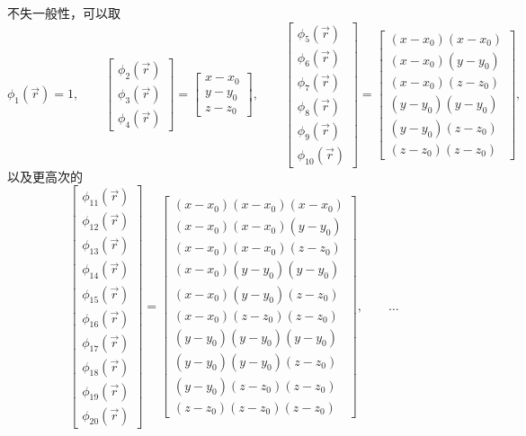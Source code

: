 不失一般性，可以取
\begin{equation}
\phi_{1}(\vec{r})=1,\qquad\begin{bmatrix}\phi_{2}(\vec{r})\\
\phi_{3}(\vec{r})\\
\phi_{4}(\vec{r})
\end{bmatrix}=\begin{bmatrix}x-x_{0}\\
y-y_{0}\\
z-z_{0}
\end{bmatrix},\qquad\begin{bmatrix}\phi_{5}(\vec{r})\\
\phi_{6}(\vec{r})\\
\phi_{7}(\vec{r})\\
\phi_{8}(\vec{r})\\
\phi_{9}(\vec{r})\\
\phi_{10}(\vec{r})
\end{bmatrix}=\begin{bmatrix}(x-x_{0})(x-x_{0})\\
(x-x_{0})(y-y_{0})\\
(x-x_{0})(z-z_{0})\\
(y-y_{0})(y-y_{0})\\
(y-y_{0})(z-z_{0})\\
(z-z_{0})(z-z_{0})
\end{bmatrix},
\end{equation}
以及更高次的
\begin{equation}
\begin{bmatrix}\phi_{11}(\vec{r})\\
\phi_{12}(\vec{r})\\
\phi_{13}(\vec{r})\\
\phi_{14}(\vec{r})\\
\phi_{15}(\vec{r})\\
\phi_{16}(\vec{r})\\
\phi_{17}(\vec{r})\\
\phi_{18}(\vec{r})\\
\phi_{19}(\vec{r})\\
\phi_{20}(\vec{r})
\end{bmatrix}=\begin{bmatrix}(x-x_{0})(x-x_{0})(x-x_{0})\\
(x-x_{0})(x-x_{0})(y-y_{0})\\
(x-x_{0})(x-x_{0})(z-z_{0})\\
(x-x_{0})(y-y_{0})(y-y_{0})\\
(x-x_{0})(y-y_{0})(z-z_{0})\\
(x-x_{0})(z-z_{0})(z-z_{0})\\
(y-y_{0})(y-y_{0})(y-y_{0})\\
(y-y_{0})(y-y_{0})(z-z_{0})\\
(y-y_{0})(z-z_{0})(z-z_{0})\\
(z-z_{0})(z-z_{0})(z-z_{0})
\end{bmatrix},\qquad\dots
\end{equation}
